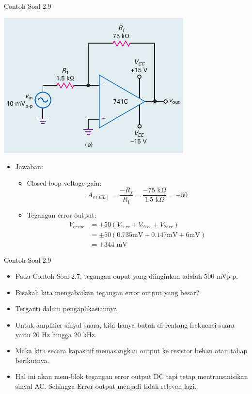 \begin{frame}{Contoh Soal 2.9}
	\begin{multicols}{2}
		\begin{center}
			\includegraphics[width=\linewidth]{gambar/fig-16.17a}
		\end{center}
		\columnbreak
		\begin{itemize}
			\item Jawaban:
			\begin{itemize}
				\item Closed-loop voltage gain:
				\[ A_{v(CL)} = \frac{-R_f}{R_1} = \frac{-75 \text{ k}\Omega}{1.5 \text{ k}\Omega} = -50\]
				\item Tegangan error output:
				\begin{align*}
					V_{error} &= \pm 50 (V_{1err} + V_{2err} + V_{2err}) \\
					&= \pm 50 (0.735 \text{mV} + 0.147 \text{mV} + 6 \text{mV}) \\
					&= \pm 344 \text{ mV}
				\end{align*}
			\end{itemize}
		\end{itemize}
	\end{multicols}
\end{frame}

\begin{frame}{Contoh Soal 2.9}
	\begin{itemize}
		\item Pada Contoh Soal 2.7, tegangan ouput yang diinginkan adalah 500 mVp-p.
		\item Bisakah kita mengabaikan tegangan error output yang besar?
		\item Terganti dalam pengaplikasiannya.
		\item Untuk amplifier sinyal suara, kita hanya butuh di rentang frekuensi suara yaitu 20 Hz hingga 20 kHz.
		\item Maka kita secara kapasitif memasangkan output ke resistor beban atau tahap berikutnya.
		\item Hal ini akan mem-blok tegangan error output DC tapi tetap mentransmisikan sinyal AC. Sehingga Error output menjadi tidak relevan lagi.
	\end{itemize}
\end{frame}

